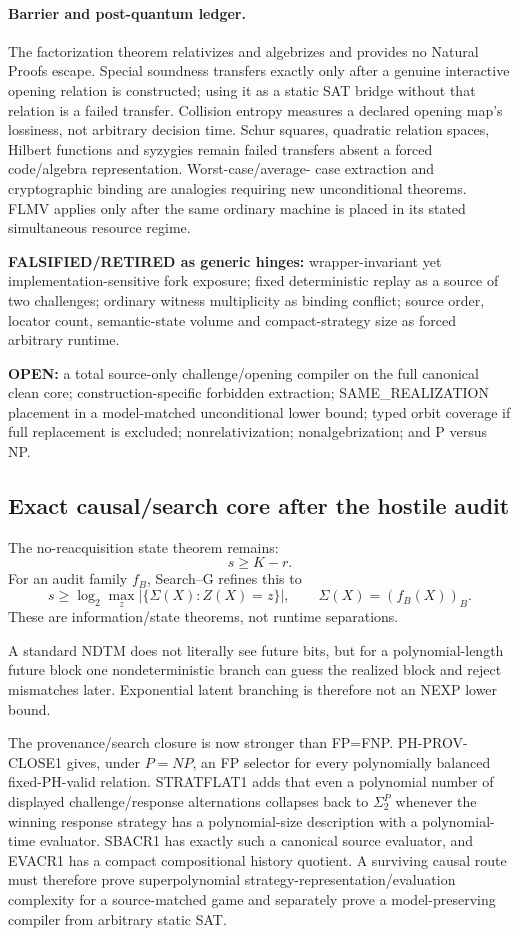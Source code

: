 \documentclass[11pt]{article}
\begin{document}
\paragraph{Barrier and post-quantum ledger.}
The factorization theorem relativizes and algebrizes and provides no Natural
Proofs escape.  Special soundness transfers exactly only after a genuine
interactive opening relation is constructed; using it as a static SAT bridge
without that relation is a failed transfer.  Collision entropy measures a
declared opening map's lossiness, not arbitrary decision time.  Schur squares,
quadratic relation spaces, Hilbert functions and syzygies remain failed
transfers absent a forced code/algebra representation.  Worst-case/average-
case extraction and cryptographic binding are analogies requiring new
unconditional theorems.  FLMV applies only after the same ordinary machine is
placed in its stated simultaneous resource regime.

\textbf{FALSIFIED/RETIRED as generic hinges:} wrapper-invariant yet
implementation-sensitive fork exposure; fixed deterministic replay as a
source of two challenges; ordinary witness multiplicity as binding conflict;
source order, locator count, semantic-state volume and compact-strategy size
as forced arbitrary runtime.

\textbf{OPEN:} a total source-only challenge/opening compiler on the full
canonical clean core; construction-specific forbidden extraction;
SAME\_REALIZATION placement in a model-matched unconditional lower bound;
typed orbit coverage if full replacement is excluded; nonrelativization;
nonalgebrization; and P versus NP.

\subsection{Exact causal/search core after the hostile audit}

The no-reacquisition state theorem remains:
\[
\boxed{s\ge K-r.}
\]
For an audit family \(f_B\), Search--G refines this to
\[
\boxed{
s\ge
\log_2\max_z
\left|\{\Sigma(X):Z(X)=z\}\right|,
\qquad
\Sigma(X)=(f_B(X))_B.
}
\]
These are information/state theorems, not runtime separations.

A standard NDTM does not literally see future bits, but for a polynomial-length future block one
nondeterministic branch can guess the realized block and reject mismatches later. Exponential latent
branching is therefore not an NEXP lower bound.

The provenance/search closure is now stronger than FP=FNP. PH-PROV-CLOSE1 gives, under \(P=NP\),
an FP selector for every polynomially balanced fixed-PH-valid relation. STRATFLAT1 adds that even a
polynomial number of displayed challenge/response alternations collapses back to \(\Sigma_2^P\)
whenever the winning response strategy has a polynomial-size description with a polynomial-time
evaluator. SBACR1 has exactly such a canonical source evaluator, and EVACR1 has a compact
compositional history quotient. A surviving causal route must therefore prove superpolynomial
strategy-representation/evaluation complexity for a source-matched game and separately prove a
model-preserving compiler from arbitrary static SAT.
\end{document}
